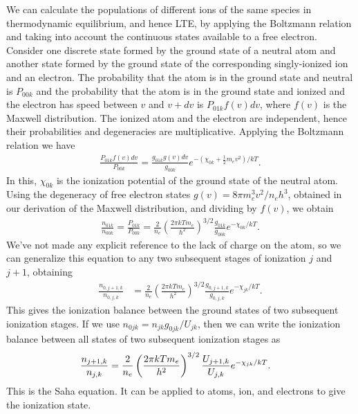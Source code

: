 We can calculate the populations of different ions of the same species
in thermodynamic equilibrium, and hence LTE, by applying the Boltzmann
relation and taking into account the continuous states available to a
free electron. Consider one discrete state formed by the ground state of
a neutral atom and another state formed by the ground state of the
corresponding singly-ionized ion and an electron. The probability that
the atom is in the ground state and neutral is $P_{00k}$ and the
probability that the atom is in the ground state and ionized and the
electron has speed between $v$ and $v+dv$ is $P_{01k}f(v)dv$, where
$f(v)$ is the Maxwell distribution. The ionized atom and the electron
are independent, hence their probabilities and degeneracies are
multiplicative. Applying the Boltzmann relation we have
\begin{align}
\frac{P_{01k}f(v)dv}{P_{00k}}
=
\frac{g_{01k}g(v)dv}{g_{00k}} e^{-(\chi_{0k} + \frac{1}{2}m_e v^2)/kT}.
\end{align}
In this, $\chi_{0k}$ is the ionization potential of the ground state of
the neutral atom. 
Using the degeneracy of free electron states $g(v) =
8\pi m_e^3 v^2/n_eh^3$, obtained in our derivation of the Maxwell
distribution, and dividing by $f(v)$, we obtain
\begin{align}
\frac{n_{01k}}{n_{00k}} 
=
\frac{P_{01k}}{P_{00k}} 
=
\frac{2}{n_e}
\left(\frac{2 \pi kT m_e}{h^2}\right)^{3/2}
\frac{g_{01k}}{g_{00k}} 
e^{-\chi_{0k}/kT}.
\end{align}
We've not made any explicit reference to the lack of charge on the atom,
so we can generalize this equation to any two subsequent stages of
ionization $j$ and $j+1$, obtaining
\begin{align}
\frac{n_{0,j+1,k}}{n_{0,j,k}} 
&=
\frac{2}{n_e}
\left(\frac{2 \pi kT m_e}{h^2}\right)^{3/2}
\frac{g_{0,j+1,k}}{g_{0,j,k}} 
e^{-\chi_{jk}/kT}.
\end{align}
This gives the ionization balance between the
ground states of two subsequent ionization stages. If we use
$n_{0jk} = n_{jk} g_{0jk}/U_{jk}$, then we can write the
ionization balance between all states of two subsequent
ionization stages as
\begin{align}
\frac{n_{j+1,k}}{n_{j,k}}
&=
\frac{2}{n_e}
\left(\frac{2 \pi kT m_e}{h^2}\right)^{3/2}
\frac{U_{j+1,k}}{U_{j,k}} 
e^{-\chi_{jk}/kT}.
\eqlabel{saha-n-j}
\end{align}
This is the Saha equation. It can be applied to atoms, ion, and
electrons to give the ionization state.

